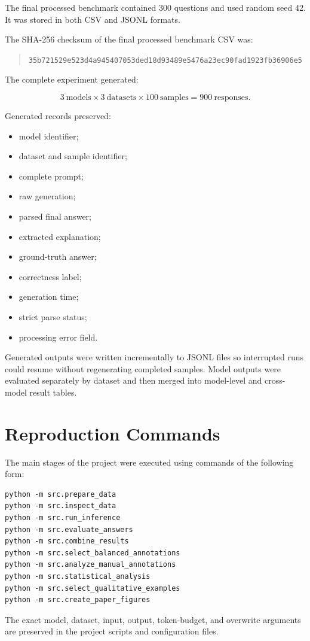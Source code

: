 \documentclass{article}
\begin{document}
The final processed benchmark contained 300 questions and used random seed 42.
It was stored in both CSV and JSONL formats.

The SHA-256 checksum of the final processed benchmark CSV was:

\begin{quote}
\small
\texttt{35b721529e523d4a945407053ded18d93489e5476a23ec90fad1923fb36906e5}
\end{quote}

The complete experiment generated:

\[
3\ \text{models}
\times
3\ \text{datasets}
\times
100\ \text{samples}
=
900\ \text{responses}.
\]

Generated records preserved:

\begin{itemize}
    \item model identifier;
    \item dataset and sample identifier;
    \item complete prompt;
    \item raw generation;
    \item parsed final answer;
    \item extracted explanation;
    \item ground-truth answer;
    \item correctness label;
    \item generation time;
    \item strict parse status;
    \item processing error field.
\end{itemize}

Generated outputs were written incrementally to JSONL files so interrupted
runs could resume without regenerating completed samples. Model outputs were
evaluated separately by dataset and then merged into model-level and
cross-model result tables.

\section{Reproduction Commands}
\label{app:commands}

The main stages of the project were executed using commands of the following
form:

\begin{verbatim}
python -m src.prepare_data
python -m src.inspect_data
python -m src.run_inference
python -m src.evaluate_answers
python -m src.combine_results
python -m src.select_balanced_annotations
python -m src.analyze_manual_annotations
python -m src.statistical_analysis
python -m src.select_qualitative_examples
python -m src.create_paper_figures
\end{verbatim}

The exact model, dataset, input, output, token-budget, and overwrite arguments
are preserved in the project scripts and configuration files.
\end{document}
